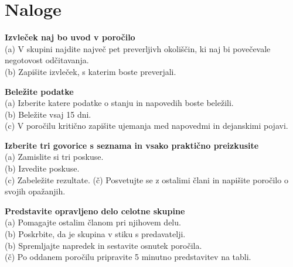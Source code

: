 \section*{Naloge}
\begin{prob}
	\label{Nal:GnssPrak_Izvl}
	\textbf{Izvleček naj bo uvod v poročilo}\\
	(a) V skupini najdite največ pet preverljivh okoliščin, ki naj bi povečevale negotovost odčitavanja.\\
	(b) Zapišite izvleček, s katerim boste preverjali.
\end{prob}

\begin{prob}
	\label{Nal:GnssPrak_Belez}
	\textbf{Beležite podatke }\\
	(a) Izberite katere podatke o stanju in napovedih boste beležili.\\
	(b) Beležite vsaj 15 dni. \\
	(c) V poročilu kritično zapišite ujemanja med napovedmi in dejanskimi pojavi.
\end{prob}

\begin{prob}
	\label{Nal:GnssPrak_Eksp}
	\textbf{Izberite tri govorice s seznama in vsako praktično preizkusite}\\
	(a) Zamislite si tri poskuse.\\
	(b) Izvedite poskuse. \\
	(c) Zabeležite rezultate.
	(č) Posvetujte se z ostalimi člani in napišite poročilo o svojih opažanjih.
\end{prob}

\begin{prob}
	\label{Nal:GnssPrak_Predst}
	\textbf{Predstavite opravljeno delo celotne skupine}\\
	(a) Pomagajte ostalim članom pri njihovem delu. \\
	(b) Poskrbite, da je skupina v stiku s predavatelji.\\
	(b) Spremljajte napredek in sestavite osnutek poročila. \\
	(č) Po oddanem poročilu pripravite 5 minutno predstavitev na tabli.
\end{prob}
%
